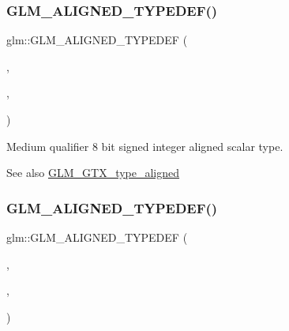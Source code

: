 \subsubsection{\texorpdfstring{G\+L\+M\+\_\+\+A\+L\+I\+G\+N\+E\+D\+\_\+\+T\+Y\+P\+E\+D\+E\+F()}{GLM\_ALIGNED\_TYPEDEF()}\hspace{0.1cm}{\footnotesize\ttfamily [13/209]}}
{\footnotesize\ttfamily glm\+::\+G\+L\+M\+\_\+\+A\+L\+I\+G\+N\+E\+D\+\_\+\+T\+Y\+P\+E\+D\+EF (\begin{DoxyParamCaption}\item[{\hyperlink{group__gtc__type__precision_ga3ee8faab2278c44c5785af04b7b18a14}{mediump\+\_\+int8}}]{,  }\item[{aligned\+\_\+mediump\+\_\+int8}]{,  }\item[{1}]{ }\end{DoxyParamCaption})}

Medium qualifier 8 bit signed integer aligned scalar type. \begin{DoxySeeAlso}{See also}
\hyperlink{group__gtx__type__aligned}{G\+L\+M\+\_\+\+G\+T\+X\+\_\+type\+\_\+aligned} 
\end{DoxySeeAlso}
\mbox{\label{group__gtx__type__aligned_ga78f443d88f438575a62b5df497cdf66b}} 
\subsubsection{\texorpdfstring{G\+L\+M\+\_\+\+A\+L\+I\+G\+N\+E\+D\+\_\+\+T\+Y\+P\+E\+D\+E\+F()}{GLM\_ALIGNED\_TYPEDEF()}\hspace{0.1cm}{\footnotesize\ttfamily [14/209]}}
{\footnotesize\ttfamily glm\+::\+G\+L\+M\+\_\+\+A\+L\+I\+G\+N\+E\+D\+\_\+\+T\+Y\+P\+E\+D\+EF (\begin{DoxyParamCaption}\item[{\hyperlink{group__gtc__type__precision_ga4611997edb6c61606daa11990cf08798}{mediump\+\_\+int16}}]{,  }\item[{aligned\+\_\+mediump\+\_\+int16}]{,  }\item[{2}]{ }\end{DoxyParamCaption})}

